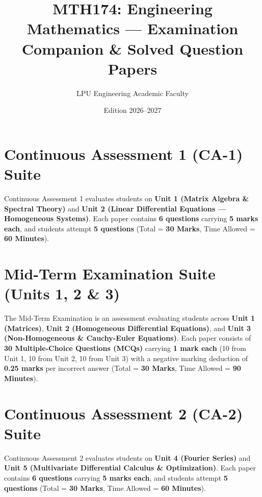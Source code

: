 \documentclass[a4paper,11pt,oneside,openany]{book}
\title{MTH174: Engineering Mathematics --- Examination Companion \& Solved Question Papers}
\author{LPU Engineering Academic Faculty}
\date{Edition 2026--2027}
\begin{document}
\frontmatter




\tableofcontents
\newpage

\mainmatter

\chapter{Continuous Assessment 1 (CA-1) Suite}
\label{chap:ca1}
\noindent
Continuous Assessment 1 evaluates students on \textbf{Unit 1 (Matrix Algebra \& Spectral Theory)} and \textbf{Unit 2 (Linear Differential Equations --- Homogeneous Systems)}. Each paper contains \textbf{6 questions} carrying \textbf{5 marks each}, and students attempt \textbf{5 questions} (Total = \textbf{30 Marks}, Time Allowed = \textbf{60 Minutes}).

\newpage



\chapter{Mid-Term Examination Suite (Units 1, 2 \& 3)}
\label{chap:midterm}
\noindent
The Mid-Term Examination is an assessment evaluating students across \textbf{Unit 1 (Matrices)}, \textbf{Unit 2 (Homogeneous Differential Equations)}, and \textbf{Unit 3 (Non-Homogeneous \& Cauchy-Euler Equations)}. Each paper consists of \textbf{30 Multiple-Choice Questions (MCQs)} carrying \textbf{1 mark each} (10 from Unit 1, 10 from Unit 2, 10 from Unit 3) with a negative marking deduction of \textbf{0.25 marks} per incorrect answer (Total = \textbf{30 Marks}, Time Allowed = \textbf{90 Minutes}).

\newpage



\chapter{Continuous Assessment 2 (CA-2) Suite}
\label{chap:ca2}
\noindent
Continuous Assessment 2 evaluates students on \textbf{Unit 4 (Fourier Series)} and \textbf{Unit 5 (Multivariate Differential Calculus \& Optimization)}. Each paper contains \textbf{6 questions} carrying \textbf{5 marks each}, and students attempt \textbf{5 questions} (Total = \textbf{30 Marks}, Time Allowed = \textbf{60 Minutes}).
\end{document}
